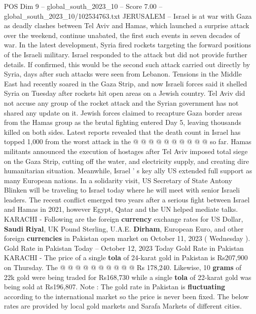 \begin{textsample}{POS Dim 9 – global\_south\_2023\_10 – Score 7.00 – global\_south\_2023\_10/102534763.txt}  \label{ex:f9_pos_078}
JERUSALEM -- Israel is at war with Gaza as deadly clashes between Tel Aviv and Hamas, which launched a surprise attack over the weekend, continue unabated, the first such events in seven decades of war.
In the latest development, Syria fired rockets targeting the forward positions of the Israeli military.
Israel responded to the attack but did not provide further details.
If confirmed, this would be the second such attack carried out directly by Syria, days after such attacks were seen from Lebanon.
Tensions in the Middle East had recently soared in the Gaza Strip, and now Israeli forces said it shelled Syria on Tuesday after rockets hit open areas on a Jewish country.
Tel Aviv did not accuse any group of the rocket attack and the Syrian government has not shared any update on it.
Jewish forces claimed to recapture Gaza border areas from the Hamas group as the brutal fighting entered Day 5, leaving thousands killed on both sides.
Latest reports revealed that the death count in Israel has topped 1,000 from the worst attack in the @ @ @ @ @ @ @ @ @ @ so far.
Hamas militants announced the execution of hostages after Tel Aviv imposed total siege on the Gaza Strip, cutting off the water, and electricity supply, and creating dire humanitarian situation.
Meanwhile, Israel ' s key ally US extended full support as many European nations.
In a solidarity visit, US Secretary of State Antony Blinken will be traveling to Israel today where he will meet with senior Israeli leaders.
The recent conflict emerged two years after a serious fight between Israel and Hamas in 2021, however Egypt, Qatar and the UN helped mediate talks.
KARACHI - Following are the foreign \textbf{currency} exchange rates for US Dollar, \textbf{Saudi} \textbf{Riyal}, UK Pound Sterling, U.A.E. \textbf{Dirham}, European Euro, and other foreign \textbf{currencies} in Pakistan open market on October 11, 2023 ( Wednesday ).
Gold Rate in Pakistan Today -- October 12, 2023 Today Gold Rate in Pakistan KARACHI - The price of a single \textbf{tola} of 24-karat gold in Pakistan is Rs207,900 on Thursday.
The @ @ @ @ @ @ @ @ @ @ Rs 178,240.
Likewise, 10 \textbf{grams} of 22k gold were being traded for Rs168,730 while a single \textbf{tola} of 22-karat gold was being sold at Rs196,807.
Note : The gold rate in Pakistan is \textbf{fluctuating} according to the international market so the price is never been fixed.
The below rates are provided by local gold markets and Sarafa Markets of different cities.

\end{textsample}
